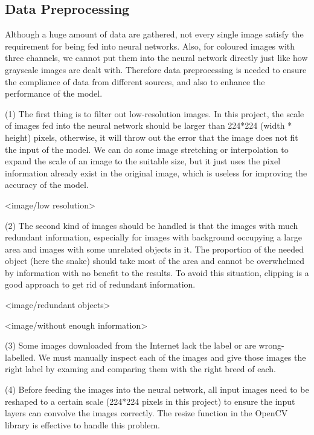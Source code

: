 \documentclass{article}
\begin{document}
\subsection{Data Preprocessing}
Although a huge amount of data are gathered, not every single image satisfy the requirement for being fed into neural networks. Also, for coloured images with three channels, we cannot put them into the neural network directly just like how grayscale images are dealt with. Therefore data preprocessing is needed to ensure the compliance of data from different sources, and also to enhance the performance of the model.

(1) The first thing is to filter out low-resolution images. In this project, the scale of images fed into the neural network should be larger than 224*224 (width * height) pixels, otherwise, it will throw out the error that the image does not fit the input of the model. We can do some image stretching or interpolation to expand the scale of an image to the suitable size, but it just uses the pixel information already exist in the original image, which is useless for improving the accuracy of the model.

<image/low resolution>

(2) The second kind of images should be handled is that the images with much redundant information, especially for images with background occupying a large area and images with some unrelated objects in it. The proportion of the needed object (here the snake) should take most of the area and cannot be overwhelmed by information with no benefit to the results. To avoid this situation, clipping is a good approach to get rid of redundant information.

<image/redundant objects>

<image/without enough information>

(3) Some images downloaded from the Internet lack the label or are wrong-labelled. We must manually inspect each of the images and give those images the right label by examing and comparing them with the right breed of each.

(4) Before feeding the images into the neural network, all input images need to be reshaped to a certain scale (224*224 pixels in this project) to ensure the input layers can convolve the images correctly. The resize function in the OpenCV library is effective to handle this problem.
\end{document}
